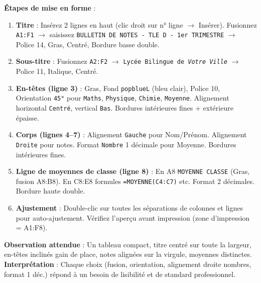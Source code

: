 \documentclass[11pt]{article}
\begin{document}
\begin{experience}
\textbf{Étapes de mise en forme} :
\begin{enumerate}
    \item \textbf{Titre} : Insérez 2 lignes en haut (clic droit sur n° ligne $\to$ Insérer). Fusionnez \texttt{A1:F1} $\to$ saisissez \texttt{BULLETIN DE NOTES - TLE D - 1er TRIMESTRE} $\to$ Police 14, Gras, Centré, Bordure basse double.
    \item \textbf{Sous-titre} : Fusionnez \texttt{A2:F2} $\to$ \texttt{Lycée Bilingue de \emph{Votre Ville}} $\to$ Police 11, Italique, Centré.
    \item \textbf{En-têtes (ligne 3)} : Gras, Fond \texttt{popblueL} (bleu clair), Police 10, Orientation \texttt{45°} pour \texttt{Maths}, \texttt{Physique}, \texttt{Chimie}, \texttt{Moyenne}. Alignement horizontal \texttt{Centré}, vertical \texttt{Bas}. Bordures intérieures fines + extérieure épaisse.
    \item \textbf{Corps (lignes 4--7)} : Alignement \texttt{Gauche} pour Nom/Prénom. Alignement \texttt{Droite} pour notes. Format \texttt{Nombre} 1 décimale pour Moyenne. Bordures intérieures fines.
    \item \textbf{Ligne de moyennes de classe (ligne 8)} : En A8 \texttt{MOYENNE CLASSE} (Gras, fusion A8:B8). En C8:E8 formules \texttt{=MOYENNE(C4:C7)} etc. Format 2 décimales. Bordure haute double.
    \item \textbf{Ajustement} : Double-clic sur toutes les séparations de colonnes et lignes pour auto-ajustement. Vérifiez l'aperçu avant impression (zone d'impression = A1:F8).
\end{enumerate}
\textbf{Observation attendue} : Un tableau compact, titre centré sur toute la largeur, en-têtes inclinés gain de place, notes alignées sur la virgule, moyennes distinctes.
\textbf{Interprétation} : Chaque choix (fusion, orientation, alignement droite nombres, format 1 déc.) répond à un besoin de lisibilité et de standard professionnel.
\end{experience}
\end{document}
